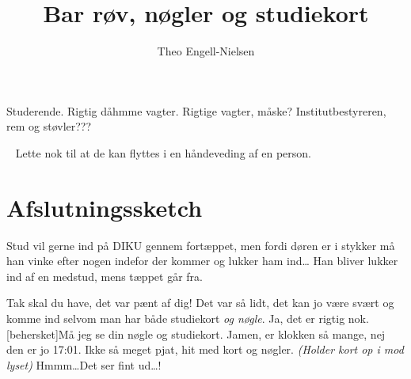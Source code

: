 \documentclass[10pt]{article}
\title{Bar røv, nøgler og studiekort}
\author{Theo Engell-Nielsen}
\begin{document}
\maketitle

\begin{sketch}

\begin{roles}
   Studerende.
   Rigtig dåhmme vagter.
   Rigtige vagter, måske?
   Institutbestyreren, rem og støvler???
   ~
   ~
\end{roles}

\begin{props}
   ~
   Lette nok til at de kan flyttes i en håndeveding af en
  person.
\end{props}


\section*{Afslutningssketch}

\scene Stud vil gerne ind på DIKU gennem fortæppet, men fordi døren er i
stykker må han vinke efter nogen indefor der kommer og lukker ham ind\ldots
Han bliver lukker ind af en medstud, mens tæppet går fra.

 Tak skal du have, det var pænt af dig!
Det var så lidt, det kan jo være svært og komme ind selvom man
har både studiekort {\em og nøgle}.
Ja, det er rigtig nok.
[behersket]Må jeg se din nøgle og studiekort.
Jamen, er klokken så mange, nej den er jo 17:01.
 Ikke så meget pjat, hit med kort og nøgler. {\em (Holder kort
  op i mod lyset)} Hmmm\ldots Det ser fint ud\ldots!


\end{sketch}
\end{document}
